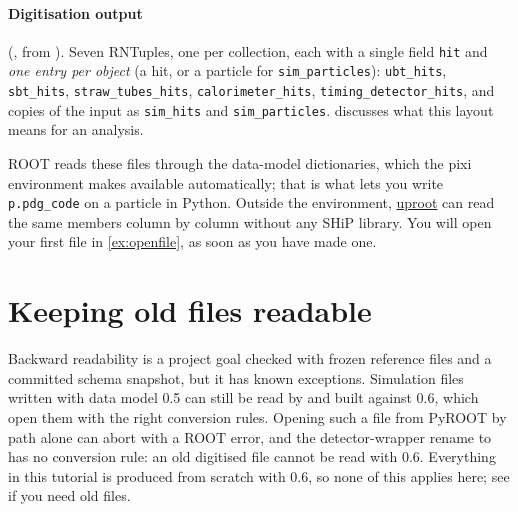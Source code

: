 \paragraph{Digitisation output} (, from ).
Seven RNTuples, one per collection, each with a single field \texttt{hit} and
\emph{one entry per object} (a hit, or a particle for \texttt{sim\_particles}):
\texttt{ubt\_hits}, \texttt{sbt\_hits}, \texttt{straw\_tubes\_hits},
\texttt{calorimeter\_hits}, \texttt{timing\_detector\_hits}, and copies of
the input as \texttt{sim\_hits} and \texttt{sim\_particles}.
 discusses what this layout means for an analysis.

\begin{note}
ROOT reads these files through the data-model dictionaries, which the pixi
environment makes available automatically; that is what lets you write
\texttt{p.pdg\_code} on a particle in Python. Outside the environment,
\href{https://github.com/scikit-hep/uproot5}{uproot} can read the same
members column by column without any SHiP library. You will open your first
file in \cref{ex:openfile}, as soon as you have made one.
\end{note}

\section{Keeping old files readable}

Backward readability is a project goal checked with frozen reference files
and a committed schema snapshot, but it has known exceptions. Simulation
files written with data model 0.5 can still be read by  and
 built against 0.6, which open them with the right conversion
rules. Opening such a file from PyROOT by path alone can abort with a ROOT
error, and the detector-wrapper rename  to  has
no conversion rule: an old digitised file cannot be read with 0.6. Everything
in this tutorial is produced from scratch with 0.6, so none of this applies
here; see  if you need old files.
